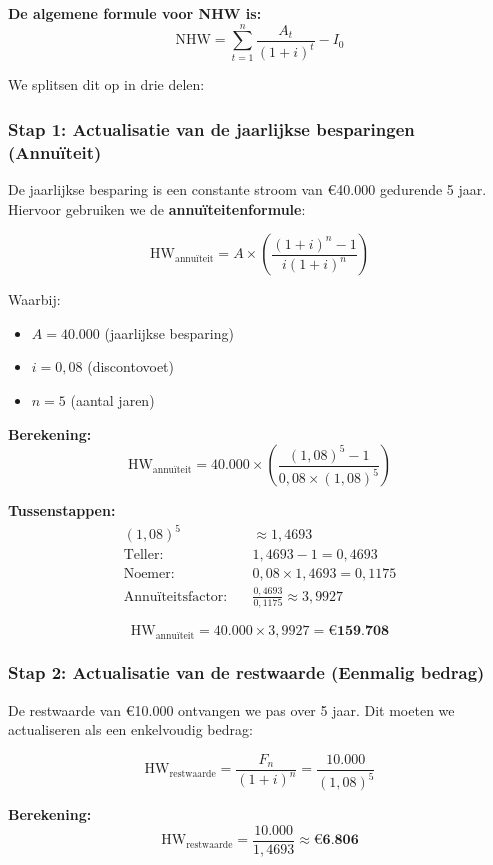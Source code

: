 \documentclass[a4paper,11pt]{article}
\begin{document}
\begin{oefenblok}
\textbf{De algemene formule voor NHW is:}
\[
\text{NHW} = \sum_{t=1}^{n} \frac{A_t}{(1+i)^t} - I_0
\]

We splitsen dit op in drie delen:

\subsubsection*{Stap 1: Actualisatie van de jaarlijkse besparingen (Annuïteit)}

De jaarlijkse besparing is een constante stroom van €40.000 gedurende 5 jaar. Hiervoor gebruiken we de \textbf{annuïteitenformule}:

\[
\text{HW}_{\text{annuïteit}} = A \times \left( \frac{(1+i)^n - 1}{i(1+i)^n} \right)
\]

Waarbij:
\begin{itemize}
    \item $A = 40.000$ (jaarlijkse besparing)
    \item $i = 0{,}08$ (discontovoet)
    \item $n = 5$ (aantal jaren)
\end{itemize}

\textbf{Berekening:}
\[
\text{HW}_{\text{annuïteit}} = 40.000 \times \left( \frac{(1{,}08)^5 - 1}{0{,}08 \times (1{,}08)^5} \right)
\]

\textbf{Tussenstappen:}
\begin{align*}
(1{,}08)^5 &\approx 1{,}4693 \\
\text{Teller:} \quad & 1{,}4693 - 1 = 0{,}4693 \\
\text{Noemer:} \quad & 0{,}08 \times 1{,}4693 = 0{,}1175 \\
\text{Annuïteitsfactor:} \quad & \frac{0{,}4693}{0{,}1175} \approx 3{,}9927
\end{align*}

\[
\text{HW}_{\text{annuïteit}} = 40.000 \times 3{,}9927 = \textbf{€159.708}
\]

\subsubsection*{Stap 2: Actualisatie van de restwaarde (Eenmalig bedrag)}

De restwaarde van €10.000 ontvangen we pas over 5 jaar. Dit moeten we actualiseren als een enkelvoudig bedrag:

\[
\text{HW}_{\text{restwaarde}} = \frac{F_n}{(1+i)^n} = \frac{10.000}{(1{,}08)^5}
\]

\textbf{Berekening:}
\[
\text{HW}_{\text{restwaarde}} = \frac{10.000}{1{,}4693} \approx \textbf{€6.806}
\]


\end{oefenblok}
\end{document}
